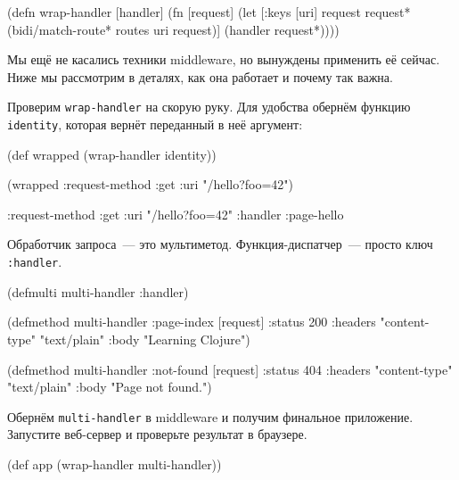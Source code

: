 \else

\begin{english}
  \begin{clojure}
(defn wrap-handler [handler]
  (fn [request]
    (let [{:keys [uri]} request
          request* (bidi/match-route* routes uri request)]
      (handler request*))))
  \end{clojure}
\end{english}

\fi

Мы ещё не касались техники middleware, но вынуждены применить её сейчас. Ниже мы
рассмотрим в деталях, как она работает и почему так важна.

Проверим \verb|wrap-handler| на скорую руку. Для удобства обернём функцию
\verb|identity|, которая вернёт переданный в неё аргумент:

\begin{english}
  \begin{clojure}
(def wrapped (wrap-handler identity))

(wrapped {:request-method :get
          :uri "/hello?foo=42"})

{:request-method :get
 :uri "/hello?foo=42"
 :handler :page-hello}
  \end{clojure}
\end{english}


Обработчик запроса~--- это мультиметод. Функция-диспатчер~--- просто ключ
\verb|:handler|.

\begin{english}
  \begin{clojure}
(defmulti multi-handler
  :handler)

(defmethod multi-handler :page-index
  [request]
  {:status 200
   :headers {"content-type" "text/plain"}
   :body "Learning Clojure"})

(defmethod multi-handler :not-found
  [request]
  {:status 404
   :headers {"content-type" "text/plain"}
   :body "Page not found."})
  \end{clojure}
\end{english}

Обернём \verb|multi-handler| в middleware и получим финальное
приложение. Запустите веб-сервер и проверьте результат в браузере.

\begin{english}
  \begin{clojure}
(def app (wrap-handler multi-handler))
  \end{clojure}
\end{english}

